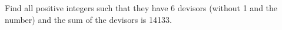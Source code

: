 Find all positive integers such that they have 6 devisors (without 1 and the number) and the sum of the devisors is 14133.